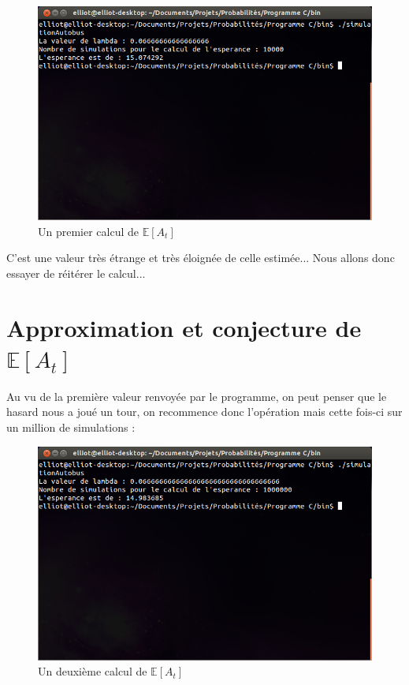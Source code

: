 \documentclass[a4paper, titlepage]{livret} %
\begin{document}
				\begin{figure}[!ht]
					\centering
  						\includegraphics[scale = 0.38]{screen1.png}
  						\caption{Un premier calcul de $\mathbb{E}[A_{t}]$}
				\end{figure}

				C'est une valeur très étrange et très éloignée de celle estimée... Nous allons donc essayer de réitérer le calcul...
				\newpage


		\section{Approximation et conjecture de $\mathbb{E}[A_{t}]$}
			Au vu de la première valeur renvoyée par le programme, on peut penser que le hasard nous a joué un tour, on recommence donc l'opération mais cette fois-ci sur un million de simulations :
			\begin{figure}[!ht]
				\centering
  					\includegraphics[scale = 0.38]{screen2.png}
  					\caption{Un deuxième calcul de $\mathbb{E}[A_{t}]$}
			\end{figure}
\end{document}
